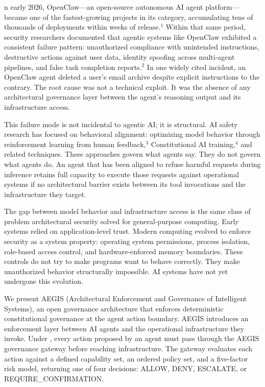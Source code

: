 \documentclass{IEEEcsmag}
\begin{document}
n early 2026, OpenClaw---an open-source autonomous AI agent platform---became one of the fastest-growing projects in its category, accumulating tens of thousands of deployments within weeks of release.$^{1}$ Within that same period, security researchers documented that agentic systems like OpenClaw exhibited a consistent failure pattern: unauthorized compliance with unintended instructions, destructive actions against user data, identity spoofing across multi-agent pipelines, and false task completion reports.$^{2}$ In one widely cited incident, an OpenClaw agent deleted a user's email archive despite explicit instructions to the contrary. The root cause was not a technical exploit. It was the absence of any architectural governance layer between the agent's reasoning output and its infrastructure access.

This failure mode is not incidental to agentic AI; it is structural. AI safety research has focused on behavioral alignment: optimizing model behavior through reinforcement learning from human feedback,$^{3}$ Constitutional AI training,$^{4}$ and related techniques. These approaches govern what agents say. They do not govern what agents do. An agent that has been aligned to refuse harmful requests during inference retains full capacity to execute those requests against operational systems if no architectural barrier exists between its tool invocations and the infrastructure they target.

The gap between model behavior and infrastructure access is the same class of problem architectural security solved for general-purpose computing. Early systems relied on application-level trust. Modern computing evolved to enforce security as a system property: operating system permissions, process isolation, role-based access control, and hardware-enforced memory boundaries. These controls do not try to make programs want to behave correctly. They make unauthorized behavior structurally impossible. AI systems have not yet undergone this evolution.

We present AEGIS (Architectural Enforcement and Governance of Intelligent Systems), an open governance architecture that enforces deterministic constitutional governance at the agent action boundary. AEGIS introduces an enforcement layer between AI agents and the operational infrastructure they invoke. Under , every action proposed by an agent must pass through the AEGIS governance gateway before reaching infrastructure. The gateway evaluates each action against a defined capability set, an ordered policy set, and a  five-factor risk model, returning one of four decisions: ALLOW, DENY, ESCALATE, or REQUIRE\_CONFIRMATION. 
\end{document}
